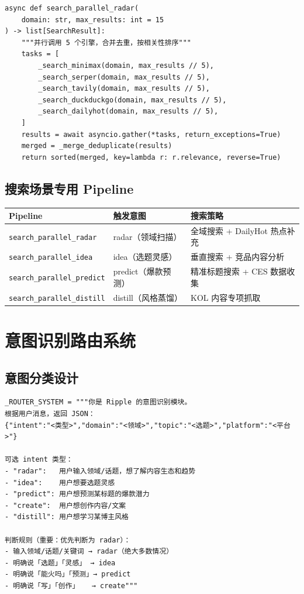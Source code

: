 \documentclass[12pt,a4paper]{ctexart}
\begin{document}
\begin{lstlisting}[style=pycode,caption={adapters/search.py — 并行搜索矩阵}]
async def search_parallel_radar(
    domain: str, max_results: int = 15
) -> list[SearchResult]:
    """并行调用 5 个引擎，合并去重，按相关性排序"""
    tasks = [
        _search_minimax(domain, max_results // 5),
        _search_serper(domain, max_results // 5),
        _search_tavily(domain, max_results // 5),
        _search_duckduckgo(domain, max_results // 5),
        _search_dailyhot(domain, max_results // 5),
    ]
    results = await asyncio.gather(*tasks, return_exceptions=True)
    merged = _merge_deduplicate(results)
    return sorted(merged, key=lambda r: r.relevance, reverse=True)
\end{lstlisting}

\subsection{搜索场景专用 Pipeline}

\begin{center}
{\small
\begin{tabular}{>{\raggedright\arraybackslash}p{4cm} p{3cm} >{\raggedright\arraybackslash}p{7cm}}
\toprule
\textbf{Pipeline} & \textbf{触发意图} & \textbf{搜索策略} \\
\midrule
\texttt{search\_parallel\_radar} & radar（领域扫描） & 全域搜索 + DailyHot 热点补充 \\[2pt]
\texttt{search\_parallel\_idea} & idea（选题灵感） & 垂直搜索 + 竞品内容分析 \\[2pt]
\texttt{search\_parallel\_predict} & predict（爆款预测） & 精准标题搜索 + CES 数据收集 \\[2pt]
\texttt{search\_parallel\_distill} & distill（风格蒸馏） & KOL 内容专项抓取 \\
\bottomrule
\end{tabular}
}
\end{center}


\section{意图识别路由系统}

\subsection{意图分类设计}

\begin{lstlisting}[style=pycode,caption={core/intent.py — 意图路由 Prompt}]
_ROUTER_SYSTEM = """你是 Ripple 的意图识别模块。
根据用户消息，返回 JSON：
{"intent":"<类型>","domain":"<领域>","topic":"<选题>","platform":"<平台>"}

可选 intent 类型：
- "radar":   用户输入领域/话题，想了解内容生态和趋势
- "idea":    用户想要选题灵感
- "predict": 用户想预测某标题的爆款潜力
- "create":  用户想创作内容/文案
- "distill": 用户想学习某博主风格

判断规则（重要：优先判断为 radar）：
- 输入领域/话题/关键词 → radar（绝大多数情况）
- 明确说「选题」「灵感」 → idea
- 明确说「能火吗」「预测」→ predict
- 明确说「写」「创作」   → create"""
\end{lstlisting}
\end{document}
